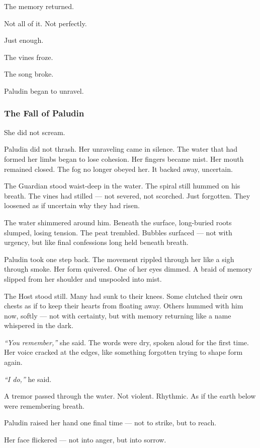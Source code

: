 \documentclass[12pt]{article}
\begin{document}
The memory returned.

Not all of it. Not perfectly.

Just enough.

The vines froze.

The song broke.

Paludin began to unravel.

\dotfill

\subsubsection*{The Fall of Paludin}

She did not scream.

Paludin did not thrash. Her unraveling came in silence. The water that had formed her limbs began to lose cohesion. Her fingers became mist. Her mouth remained closed. The fog no longer obeyed her. It backed away, uncertain.

The Guardian stood waist-deep in the water. The spiral still hummed on his breath. The vines had stilled — not severed, not scorched. Just forgotten. They loosened as if uncertain why they had risen.

The water shimmered around him. Beneath the surface, long-buried roots slumped, losing tension. The peat trembled. Bubbles surfaced — not with urgency, but like final confessions long held beneath breath.

Paludin took one step back. The movement rippled through her like a sigh through smoke. Her form quivered. One of her eyes dimmed. A braid of memory slipped from her shoulder and unspooled into mist.

The Host stood still. Many had sunk to their knees. Some clutched their own chests as if to keep their hearts from floating away. Others hummed with him now, softly — not with certainty, but with memory returning like a name whispered in the dark.

\textit{``You remember,''} she said. The words were dry, spoken aloud for the first time. Her voice cracked at the edges, like something forgotten trying to shape form again.

\textit{``I do,''} he said.

A tremor passed through the water. Not violent. Rhythmic. As if the earth below were remembering breath.

Paludin raised her hand one final time — not to strike, but to reach.

Her face flickered — not into anger, but into sorrow.
\end{document}
